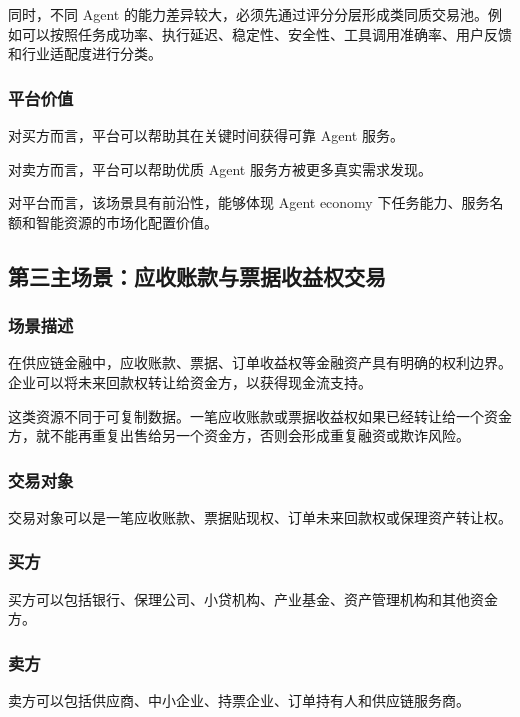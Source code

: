 \documentclass[UTF8,a4paper,12pt]{ctexart}
\begin{document}
同时，不同 Agent 的能力差异较大，必须先通过评分分层形成类同质交易池。例如可以按照任务成功率、执行延迟、稳定性、安全性、工具调用准确率、用户反馈和行业适配度进行分类。

\subsubsection*{平台价值}

对买方而言，平台可以帮助其在关键时间获得可靠 Agent 服务。

对卖方而言，平台可以帮助优质 Agent 服务方被更多真实需求发现。

对平台而言，该场景具有前沿性，能够体现 Agent economy 下任务能力、服务名额和智能资源的市场化配置价值。

\subsection{第三主场景：应收账款与票据收益权交易}

\subsubsection*{场景描述}

在供应链金融中，应收账款、票据、订单收益权等金融资产具有明确的权利边界。企业可以将未来回款权转让给资金方，以获得现金流支持。

这类资源不同于可复制数据。一笔应收账款或票据收益权如果已经转让给一个资金方，就不能再重复出售给另一个资金方，否则会形成重复融资或欺诈风险。

\subsubsection*{交易对象}

交易对象可以是一笔应收账款、票据贴现权、订单未来回款权或保理资产转让权。

\subsubsection*{买方}

买方可以包括银行、保理公司、小贷机构、产业基金、资产管理机构和其他资金方。

\subsubsection*{卖方}

卖方可以包括供应商、中小企业、持票企业、订单持有人和供应链服务商。
\end{document}
